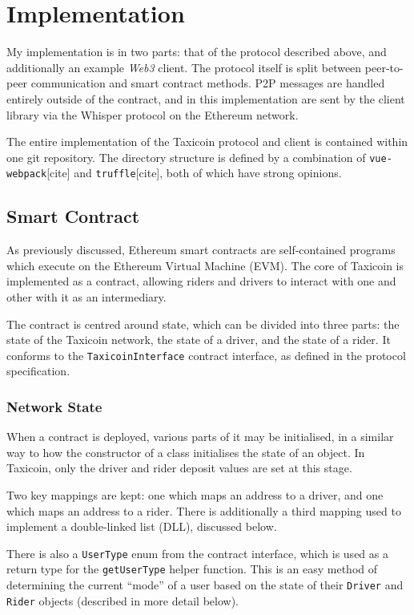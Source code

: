 \section{Implementation}

My implementation is in two parts: that of the protocol described above, and additionally an example \textit{Web3} client. The protocol itself is split between peer-to-peer communication and smart contract methods. P2P messages are handled entirely outside of the contract, and in this implementation are sent by the client library via the Whisper protocol on the Ethereum network.

The entire implementation of the Taxicoin protocol and client is contained within one git repository. The directory structure is defined by a combination of \lstinline{vue-webpack}[cite] and \lstinline{truffle}[cite], both of which have strong opinions. %

\subsection{Smart Contract}

As previously discussed, Ethereum smart contracts are self-contained programs which execute on the Ethereum Virtual Machine (EVM). The core of Taxicoin is implemented as a contract, allowing riders and drivers to interact with one and other with it as an intermediary.

The contract is centred around state, which can be divided into three parts: the state of the Taxicoin network, the state of a driver, and the state of a rider. It conforms to the \lstinline{TaxicoinInterface} contract interface, as defined in the protocol specification.

\subsubsection{Network State}

When a contract is deployed, various parts of it may be initialised, in a similar way to how the constructor of a class initialises the state of an object. In Taxicoin, only the driver and rider deposit values are set at this stage.

Two key mappings are kept: one which maps an address to a driver, and one which maps an address to a rider. There is additionally a third mapping used to implement a double-linked list (DLL), discussed below.

There is also a \lstinline{UserType} enum from the contract interface, which is used as a return type for the \lstinline{getUserType} helper function. This is an easy method of determining the current \enquote{mode} of a user based on the state of their \lstinline{Driver} and \lstinline{Rider} objects (described in more detail below).

